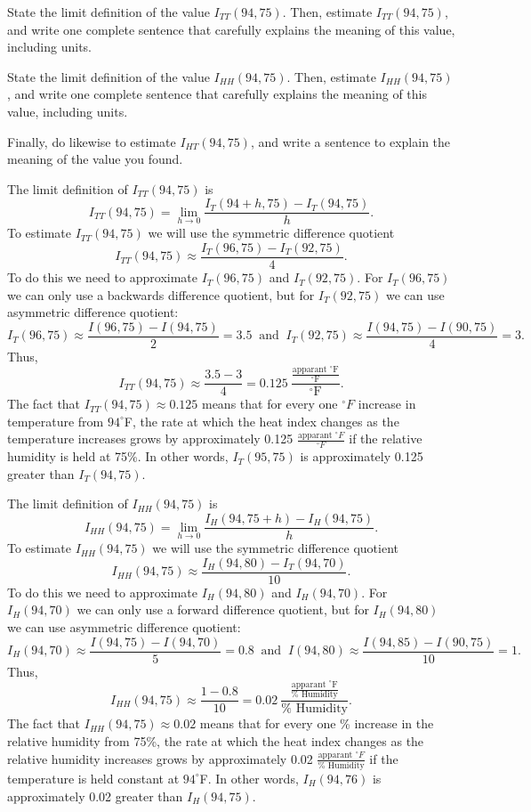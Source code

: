 \begin{exercises}
				
    \ba
   	\item State the limit definition of the value $I_{TT}(94,75)$.  Then, estimate $I_{TT}(94,75)$, and write one complete sentence that carefully explains the meaning of this value, including units.	
	

	\item State the limit definition of the value $I_{HH}(94,75)$.  Then, estimate $I_{HH}(94,75)$, and write one complete sentence that carefully explains the meaning of this value, including units.
	
	\item Finally, do likewise to estimate $I_{HT}(94,75)$, and write a sentence to explain the meaning of the value you found.
	
   \ea
   

\begin{exerciseSolution}
    \ba
   	\item The limit definition of $I_{TT}(94,75)$ is
\[I_{TT}(94,75) = \lim_{h \to 0} \frac{I_T(94+h,75)-I_T(94,75)}{h}.\]
To estimate  $I_{TT}(94,75)$ we will use the symmetric difference quotient 
\[I_{TT}(94,75) \approx \frac{I_T(96,75) - I_T(92,75)}{4}.\]
To do this we need to approximate $I_T(96,75)$ and $I_T(92,75)$. For $I_T(96,75)$ we can only use a backwards difference quotient, but for $I_T(92,75)$ we can use asymmetric difference quotient:
\[I_T(96,75) \approx \frac{I(96,75)-I(94,75)}{2} = 3.5 \ \text{ and } \ I_T(92,75) \approx \frac{I(94,75)-I(90,75)}{4} = 3.\]
Thus,
\[I_{TT}(94,75) \approx \frac{3.5 - 3}{4} = 0.125 \ \frac{\frac{\text{apparant }^{\circ}\text{F}}{^{\circ}\text{F}}}{^{\circ}\text{F}}.\]
The fact that $I_{TT}(94,75) \approx 0.125$ means that for every one $^{\circ}F$ increase in temperature from $94^{\circ}$F, the rate at which the heat index changes as the temperature increases grows by approximately 0.125 $\frac{\text{apparant }^{\circ}F}{^{\circ}F}$ if the relative humidity is held at 75\%. In other words, $I_{T}(95,75)$ is approximately 0.125 greater than $I_{T}(94,75)$. 


	\item The limit definition of $I_{HH}(94,75)$ is
\[I_{HH}(94,75) = \lim_{h \to 0} \frac{I_H(94,75+h)-I_H(94,75)}{h}.\]
To estimate  $I_{HH}(94,75)$ we will use the symmetric difference quotient 
\[I_{HH}(94,75) \approx \frac{I_H(94,80) - I_T(94,70)}{10}.\]
To do this we need to approximate $I_H(94,80)$ and $I_H(94,70)$. For $I_H(94,70)$ we can only use a forward difference quotient, but for $I_H(94,80)$ we can use asymmetric difference quotient:
\[I_H(94,70) \approx \frac{I(94,75)-I(94,70)}{5} = 0.8 \ \text{ and } \ I(94,80) \approx \frac{I(94,85)-I(90,75)}{10} = 1.\]
Thus,
\[I_{HH}(94,75) \approx \frac{1 - 0.8}{10} = 0.02 \ \frac{ \frac{\text{apparant }^{\circ}\text{F}}{\% \text{ Humidity}} }{\% \text{ Humidity}}.\]
The fact that $I_{HH}(94,75) \approx 0.02$ means that for every one \% increase in the relative humidity from 75\%, the rate at which the heat index changes as the relative humidity increases grows by approximately 0.02 $\frac{\text{apparant }^{\circ}F}{\% \text{ Humidity}}$ if the temperature is held constant at $94^{\circ}$F. In other words, $I_{H}(94,76)$ is approximately 0.02 greater than $I_{H}(94,75)$. 
	

\end{exerciseSolution}
\end{exercises}
